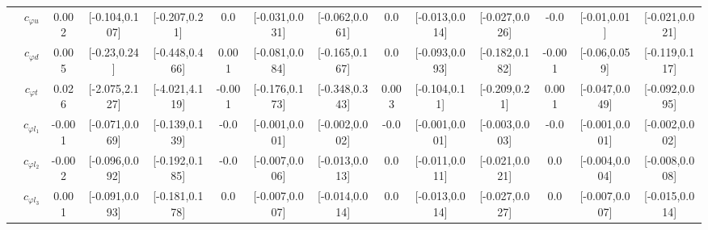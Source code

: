 \documentclass{article}
\begin{document}
\begin{table}[H]
\begin{tabular}{|c|c|c|c|c|c|c|c|c|c|c|c|c|c|}
 & $c_{\varphi u}$ & 0.002                             & [-0.104,0.107]                                 & [-0.207,0.21] & 0.0                             & [-0.031,0.031]                                 & [-0.062,0.061] & 0.0                             & [-0.013,0.014]                                 & [-0.027,0.026] & -0.0                             & [-0.01,0.01]                                 & [-0.021,0.021] \\ \cline{2-14}
 & $c_{\varphi d}$ & 0.005                             & [-0.23,0.24]                                 & [-0.448,0.466] & 0.001                             & [-0.081,0.084]                                 & [-0.165,0.167] & 0.0                             & [-0.093,0.093]                                 & [-0.182,0.182] & -0.001                             & [-0.06,0.059]                                 & [-0.119,0.117] \\ \cline{2-14}
 & $c_{\varphi t}$ & 0.026                             & [-2.075,2.127]                                 & [-4.021,4.119] & -0.001                             & [-0.176,0.173]                                 & [-0.348,0.343] & 0.003                             & [-0.104,0.11]                                 & [-0.209,0.21] & 0.001                             & [-0.047,0.049]                                 & [-0.092,0.095] \\ \cline{2-14}
 & $c_{\varphi l_1}$ & -0.001                             & [-0.071,0.069]                                 & [-0.139,0.139] & -0.0                             & [-0.001,0.001]                                 & [-0.002,0.002] & -0.0                             & [-0.001,0.001]                                 & [-0.003,0.003] & -0.0                             & [-0.001,0.001]                                 & [-0.002,0.002] \\ \cline{2-14}
 & $c_{\varphi l_2}$ & -0.002                             & [-0.096,0.092]                                 & [-0.192,0.185] & -0.0                             & [-0.007,0.006]                                 & [-0.013,0.013] & 0.0                             & [-0.011,0.011]                                 & [-0.021,0.021] & 0.0                             & [-0.004,0.004]                                 & [-0.008,0.008] \\ \cline{2-14}
 & $c_{\varphi l_3}$ & 0.001                             & [-0.091,0.093]                                 & [-0.181,0.178] & 0.0                             & [-0.007,0.007]                                 & [-0.014,0.014] & 0.0                             & [-0.013,0.014]                                 & [-0.027,0.027] & 0.0                             & [-0.007,0.007]                                 & [-0.015,0.014] \\ \cline{2-14}

\end{tabular}
\end{table}
\end{document}
